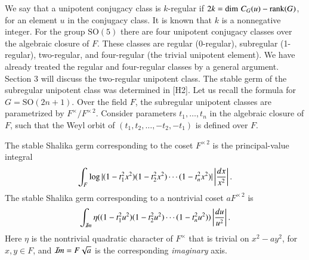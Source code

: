 \documentclass{amsart}
\newcommand\Imm{{\mathcal I\hskip-.2em m}}
\newcommand\rank{\hbox{rank}}
\newenvironment{cthm}[1]
  {\renewcommand\thethm{\bf #1}\thm}
  {\endthm}
\begin{document}
We say that a unipotent conjugacy class is $k$-regular if
$2k = \dim\,C_G(u) - \rank(G)$, for an element $u$ in the conjugacy
class.  It is known that $k$ is a nonnegative integer.   For the
group $\text{SO}(5)$ there are four unipotent conjugacy classes over the
algebraic closure of $F$.  These classes are regular (0-regular),
subregular (1-regular), two-regular, and four-regular (the trivial unipotent
element).  We have already treated the regular and four-regular classes
by a general argument.  
Section 3 will discuss the two-regular unipotent class.
The stable germ of the subregular unipotent class was determined
in [H2].  Let us recall the formula for $G=\text{SO}(2n+1)$.  Over the
field $F$, the subregular unipotent classes are parametrized by
$F^\times/F^{\times\,2}$.  
Consider parameters $t_1,\ldots, t_n$ in the algebraic closure
of $F$, such that the Weyl orbit of $(t_1,t_2,\ldots,-t_2,-t_1)$
is defined over $F$.
\bigskip

\noindent
\begin{cthm}{Theorem 1.2}  The stable Shalika germ corresponding to the
coset $F^{\times\,2}$ is the principal-value integral
$$\int_F \log |(1- t_1^2 x^2)(1-t_2^2 x^2)\cdots (1-t_n^2 x^2)| 
     \left| 
     {dx\over x^2} \right |.$$
The stable Shalika germ corresponding to a nontrivial coset $a F^{\times\,2}$
is
$$\int_{\Imm} \eta((1-t_1^2 u^2)(1-t_2^2 u^2)\cdots (1-t_n^2 u^2))
    \left| {du\over u^2} \right |.$$
Here $\eta$ is the nontrivial quadratic character of $F^\times$
that is trivial on $x^2-a y^2$, for $x,y\in F$,
and $\Imm = F\sqrt{a}$ is the corresponding
{\it imaginary} axis.
\end{cthm}
\end{document}
